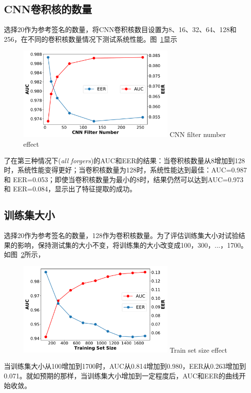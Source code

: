 \subsection{CNN卷积核的数量}
选择20作为参考签名的数量，将CNN卷积核数目设置为8、16、32、64、128和256，在不同的卷积核数量情况下测试系统性能。图~\ref{fig:filter-number-effect}显示
\begin{figure}[!htp]
  \centering
  \includegraphics[width=0.7\textwidth]{figure/filter_number_auc_eer.pdf}
      {CNN filter number effect }
  \label{fig:filter-number-effect}
\end{figure}
了在第三种情况下(\textit{all forgers})的AUC和EER的结果：当卷积核数量从8增加到128时，系统性能变得更好；当卷积核数量为128时，系统性能达到最佳：AUC=0.987 和 EER=0.053；即使当卷积核数量为最小的8时，结果仍然可以达到AUC=0.973 和 EER=0.084，显示出了特征提取的成功。 

\subsection{训练集大小}
选择20作为参考签名的数量，128作为卷积核数量。为了评估训练集大小对试验结果的影响，保持测试集的大小不变，将训练集的大小改变成100，300，...，1700。如图~\ref{fig:train-size-effect}所示，
\begin{figure}[!htp]
  \centering
  \includegraphics[width=0.7\textwidth]{figure/train_size_auc_eer.pdf}
      {Train set size effect }
  \label{fig:train-size-effect}
\end{figure}
当训练集大小从100增加到1700时，AUC从0.814增加到0.980，EER从0.263增加到0.071。就如预期的那样，当训练集大小增加到一定程度后，AUC和EER的曲线开始收敛。

